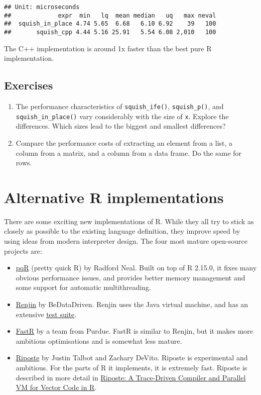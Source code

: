 \begin{verbatim}
## Unit: microseconds
##             expr  min   lq  mean median   uq   max neval
##  squish_in_place 4.74 5.65  6.68   6.10 6.92    39   100
##       squish_cpp 4.44 5.16 25.91   5.54 6.08 2,010   100
\end{verbatim}

The C++ implementation is around 1x faster than the best pure R
implementation.

\hypertarget{exercises-2}{%
\subsection{Exercises}\label{exercises-2}}

\begin{enumerate}
\def\labelenumi{\arabic{enumi}.}
\item
  The performance characteristics of \texttt{squish\_ife()},
  \texttt{squish\_p()}, and \texttt{squish\_in\_place()} vary
  considerably with the size of \texttt{x}. Explore the differences.
  Which sizes lead to the biggest and smallest differences?
\item
  Compare the performance costs of extracting an element from a list, a
  column from a matrix, and a column from a data frame. Do the same for
  rows.
\end{enumerate}

\hypertarget{faster-r}{%
\section{Alternative R implementations}\label{faster-r}}

There are some exciting new implementations of R. While they all try to
stick as closely as possible to the existing language definition, they
improve speed by using ideas from modern interpreter design. The four
most mature open-source projects are:

\begin{itemize}
\item
  \href{http://www.pqr-project.org/}{pqR} (pretty quick R) by Radford
  Neal. Built on top of R 2.15.0, it fixes many obvious performance
  issues, and provides better memory management and some support for
  automatic multithreading. 
\item
  \href{http://www.renjin.org/}{Renjin} by BeDataDriven. Renjin uses the
  Java virtual machine, and has an extensive
  \href{http://packages.renjin.org/}{test suite}. 
\item
  \href{https://github.com/allr/fastr}{FastR} by a team from Purdue.
  FastR is similar to Renjin, but it makes more ambitious optimisations
  and is somewhat less mature. 
\item
  \href{https://github.com/jtalbot/riposte}{Riposte} by Justin Talbot
  and Zachary DeVito. Riposte is experimental and ambitious. For the
  parts of R it implements, it is extremely fast. Riposte is described
  in more detail in
  \href{http://www.justintalbot.com/wp-content/uploads/2012/10/pact080talbot.pdf}{Riposte:
  A Trace-Driven Compiler and Parallel VM for Vector Code in R}.
\end{itemize}

